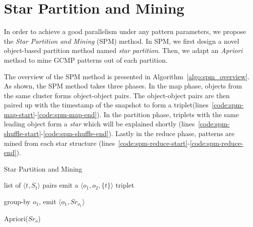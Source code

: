 \section{Star Partition and Mining}
\label{sec:spm_solution}
In order to achieve a good parallelism 
under any pattern parameters, we propose 
the \emph{Star Partition and Mining} (SPM) method. 
In SPM, we first design a novel object-based partition 
method named \emph{star partition}. Then, we adapt
an \emph{Apriori} method to mine GCMP patterns
out of each partition. 


 The overview of the SPM method 
is presented in Algorithm~\ref{algo:spm_overview}.
As shown, the SPM method takes three phases. 
In the map phase, objects from the same cluster forms object-object pairs. 
The object-object pairs are then paired up with the timestamp of 
the snapshot to form a triplet(lines~\ref{code:spm-map-start}-\ref{code:spm-map-end}). 
In the partition phase, triplets with the same leading object form a \emph{star} which will be explained shortly 
(lines~\ref{code:spm-shuffle-start}-\ref{code:spm-shuffle-end}).
Lastly in the reduce phase, patterns are mined from each star structure (lines~\ref{code:spm-reduce-start}-\ref{code:spm-reduce-end}).

\begin{algorithm}
\caption{Star Partition and Mining}
\label{algo:spm_overview}
\begin{algorithmic}[1]
\Require list of $\langle t, S_t \rangle$ pairs
\label{code:spm-map-start}
		  \label{code:spm-edge-direct}
			\State emit a $\langle o_1, o_2, \{t\}\rangle$ triplet
		\EndIf
	\EndFor
\EndFor
\label{code:spm-map-end}

\label{code:spm-shuffle-start}
	\State group-by $o_1$, emit $\langle o_1, Sr_{o_1} \rangle$ 
\EndFor
\label{code:spm-shuffle-end}

\label{code:spm-reduce-start}
\State Apriori($Sr_o$)
\EndFor
\label{code:spm-reduce-end}

\end{algorithmic}
\end{algorithm}

